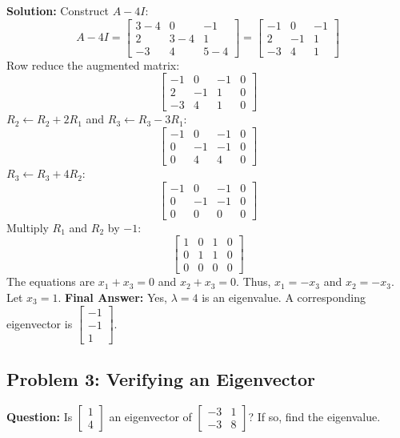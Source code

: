 \documentclass[11pt, a4paper]{article}
\theoremstyle{definition}
\theoremstyle{remark}
\begin{document}
\textbf{Solution:}
Construct $A - 4I$:
\[
A - 4I = \begin{bmatrix} 3-4 & 0 & -1 \\ 2 & 3-4 & 1 \\ -3 & 4 & 5-4 \end{bmatrix} = \begin{bmatrix} -1 & 0 & -1 \\ 2 & -1 & 1 \\ -3 & 4 & 1 \end{bmatrix}
\]
Row reduce the augmented matrix:
\[
\begin{bmatrix} -1 & 0 & -1 & 0 \\ 2 & -1 & 1 & 0 \\ -3 & 4 & 1 & 0 \end{bmatrix}
\]
$R_2 \leftarrow R_2 + 2R_1$ and $R_3 \leftarrow R_3 - 3R_1$:
\[
\begin{bmatrix} -1 & 0 & -1 & 0 \\ 0 & -1 & -1 & 0 \\ 0 & 4 & 4 & 0 \end{bmatrix}
\]
$R_3 \leftarrow R_3 + 4R_2$:
\[
\begin{bmatrix} -1 & 0 & -1 & 0 \\ 0 & -1 & -1 & 0 \\ 0 & 0 & 0 & 0 \end{bmatrix}
\]
Multiply $R_1$ and $R_2$ by $-1$:
\[
\begin{bmatrix} 1 & 0 & 1 & 0 \\ 0 & 1 & 1 & 0 \\ 0 & 0 & 0 & 0 \end{bmatrix}
\]
The equations are $x_1 + x_3 = 0$ and $x_2 + x_3 = 0$. Thus, $x_1 = -x_3$ and $x_2 = -x_3$. Let $x_3 = 1$.
\textbf{Final Answer:} Yes, $\lambda = 4$ is an eigenvalue. A corresponding eigenvector is $\begin{bmatrix} -1 \\ -1 \\ 1 \end{bmatrix}$.

\subsection{Problem 3: Verifying an Eigenvector}
\textbf{Question:} Is $\begin{bmatrix} 1 \\ 4 \end{bmatrix}$ an eigenvector of $\begin{bmatrix} -3 & 1 \\ -3 & 8 \end{bmatrix}$? If so, find the eigenvalue.
\end{document}
